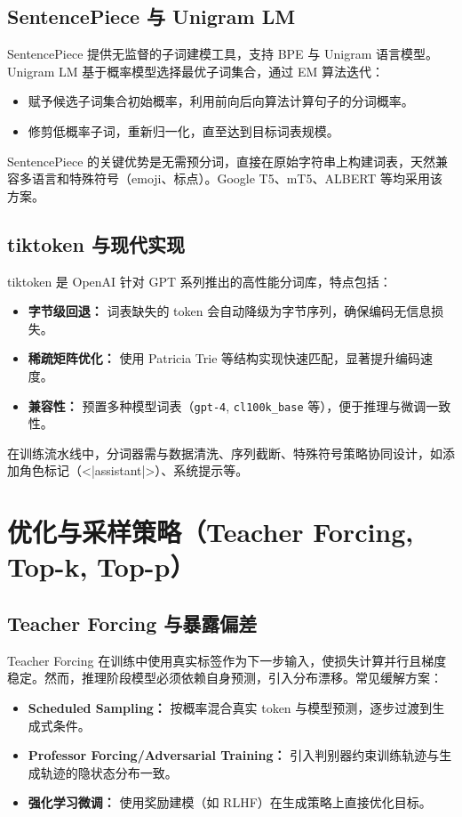 \documentclass[UTF8,zihao=-4]{ctexart}
\begin{document}
\subsection{SentencePiece 与 Unigram LM}
SentencePiece 提供无监督的子词建模工具，支持 BPE 与 Unigram 语言模型。Unigram LM 基于概率模型选择最优子词集合，通过 EM 算法迭代：
\begin{itemize}
  \item 赋予候选子词集合初始概率，利用前向后向算法计算句子的分词概率。
  \item 修剪低概率子词，重新归一化，直至达到目标词表规模。
\end{itemize}
SentencePiece 的关键优势是无需预分词，直接在原始字符串上构建词表，天然兼容多语言和特殊符号（emoji、标点）。Google T5、mT5、ALBERT 等均采用该方案。

\subsection{tiktoken 与现代实现}
tiktoken 是 OpenAI 针对 GPT 系列推出的高性能分词库，特点包括：
\begin{itemize}
  \item \textbf{字节级回退：} 词表缺失的 token 会自动降级为字节序列，确保编码无信息损失。
  \item \textbf{稀疏矩阵优化：} 使用 Patricia Trie 等结构实现快速匹配，显著提升编码速度。
  \item \textbf{兼容性：} 预置多种模型词表（\texttt{gpt-4}, \texttt{cl100k\_base} 等），便于推理与微调一致性。
\end{itemize}
在训练流水线中，分词器需与数据清洗、序列截断、特殊符号策略协同设计，如添加角色标记（<|assistant|>）、系统提示等。

\section{优化与采样策略（Teacher Forcing, Top-k, Top-p）}
\subsection{Teacher Forcing 与暴露偏差}
Teacher Forcing 在训练中使用真实标签作为下一步输入，使损失计算并行且梯度稳定。然而，推理阶段模型必须依赖自身预测，引入分布漂移。常见缓解方案：
\begin{itemize}
  \item \textbf{Scheduled Sampling：} 按概率混合真实 token 与模型预测，逐步过渡到生成式条件。
  \item \textbf{Professor Forcing/Adversarial Training：} 引入判别器约束训练轨迹与生成轨迹的隐状态分布一致。
  \item \textbf{强化学习微调：} 使用奖励建模（如 RLHF）在生成策略上直接优化目标。
\end{itemize}
\end{document}
